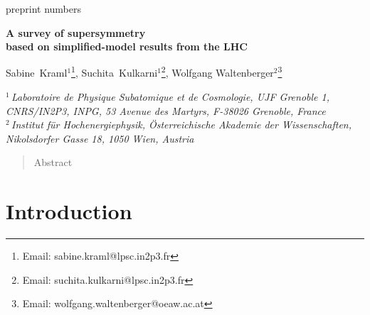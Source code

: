 \documentclass[12pt]{article}
\begin{document}
\begin{center}


\begin{flushright}
preprint numbers
\end{flushright}

\vspace*{1.6cm}
{\Large\bf A survey of supersymmetry\\[3mm] based on simplified-model results from the LHC} 

\vspace*{1cm}\renewcommand{\thefootnote}{\fnsymbol{footnote}}

{\large 
Sabine~Kraml$^{1}$\footnote[1]{Email: sabine.kraml@lpsc.in2p3.fr},
Suchita~Kulkarni$^{1}$\footnote[2]{Email: suchita.kulkarni@lpsc.in2p3.fr},
Wolfgang Waltenberger$^{2}$\footnote[3]{Email: wolfgang.waltenberger@oeaw.ac.at}
} 

\renewcommand{\thefootnote}{\arabic{footnote}}

\vspace*{1cm} 
{\normalsize \it 
$^1\,$Laboratoire de Physique Subatomique et de Cosmologie, UJF Grenoble 1,
CNRS/IN2P3, INPG, 53 Avenue des Martyrs, F-38026 Grenoble, France\\[2mm]
$^2\,$Institut f\"ur Hochenergiephysik,  \"Osterreichische Akademie der Wissenschaften,\\ Nikolsdorfer Gasse 18, 1050 Wien, Austria\\[1mm]
}

\vspace{1cm}

\begin{abstract}
  Abstract
\end{abstract}

\end{center}



\section{Introduction}
\end{document}
